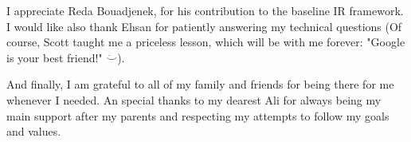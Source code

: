 I appreciate Reda Bouadjenek, for his contribution to the baseline IR framework. I would like also thank Ehsan for patiently answering my technical questions (Of course, Scott taught me a priceless lesson, which will be with me forever: "Google is your best friend!" $\ddot\smile$).

And finally, I am grateful to all of my family and friends for being there for me whenever I needed. An special thanks to my dearest Ali for always being my main support after my parents and respecting my attempts to follow my goals and values. 
